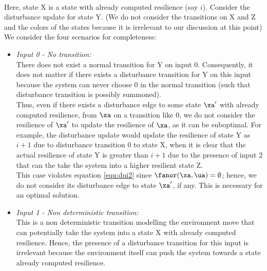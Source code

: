 \begin{itemize}
\\
Here, state X is a state with already computed resilience (say $i$). Consider the disturbance update for state Y.
(We do not consider the transitions on X and Z and the colors of the states because it is irrelevant to our discussion at this point)
We consider the four scenarios for completeness:
\begin{itemize}
\item \emph{Input 0 - No transition:}\\
There does not exist a normal transition for Y on input 0. Consequently, it does not matter if there exists a disturbance transition for Y on this input because the system can never choose 0 in the normal transition (such that disturbance transition is possibly summoned).\\
Thus, even if there exists a disturbance edge to some state $\xa'$ with already computed resilience, from $\xa$ on a transition like $0$, we do not consider the resilience of $\xa'$ to update the resilience of $\xa$, as it can be suboptimal. For example, the disturbance update would update the resilience  of state Y as $i+1$ due to disturbance transition 0 to state X, when it is clear that the actual resilience of state Y is greater than $i+1$ due to the presence of input 2 that can the take the system into a higher resilient state Z.\\
This case violates equation \ref{equ:dui2} since $\fanor(\xa, \ua) = \emptyset$; hence, we do not consider its disturbance edge to state $\xa'$, if any. This is necessary for an optimal solution.
\item \emph{Input 1 - Non deterministic transition:}\\
This is a non deterministic transition modelling the environment move that can potentially take the system into a state X with already computed resilience. Hence, the presence of a disturbance transition for this input is irrelevant because the environment itself can push the system towards a state already computed resilience.\\

\end{itemize}
\end{itemize}
